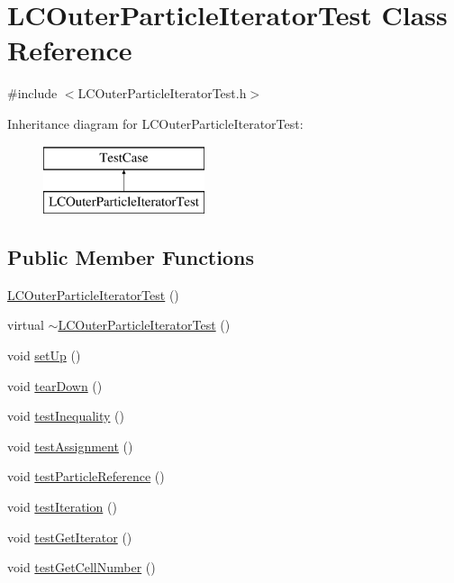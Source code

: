 \hypertarget{classLCOuterParticleIteratorTest}{\section{L\-C\-Outer\-Particle\-Iterator\-Test Class Reference}
\label{classLCOuterParticleIteratorTest}
}


{\ttfamily \#include $<$L\-C\-Outer\-Particle\-Iterator\-Test.\-h$>$}

Inheritance diagram for L\-C\-Outer\-Particle\-Iterator\-Test\-:\begin{figure}[H]
\begin{center}
\leavevmode
\includegraphics[height=2.000000cm]{classLCOuterParticleIteratorTest}
\end{center}
\end{figure}
\subsection*{Public Member Functions}
\begin{DoxyCompactItemize}
\item 
\hyperlink{classLCOuterParticleIteratorTest_aab7e474bcfba162d4d460d4b2018282c}{L\-C\-Outer\-Particle\-Iterator\-Test} ()
\item 
virtual \hyperlink{classLCOuterParticleIteratorTest_ad1ee78ab877c44be37b356f5c5b97854}{$\sim$\-L\-C\-Outer\-Particle\-Iterator\-Test} ()
\item 
void \hyperlink{classLCOuterParticleIteratorTest_a5a6f1dae02d5a9cab63956c4742f8831}{set\-Up} ()
\item 
void \hyperlink{classLCOuterParticleIteratorTest_a519ccd258d5d5ff815eb625865b436a0}{tear\-Down} ()
\item 
void \hyperlink{classLCOuterParticleIteratorTest_ad808d188130e9d259d18beb4cc879403}{test\-Inequality} ()
\item 
void \hyperlink{classLCOuterParticleIteratorTest_a671c0ec78e4b05aa68d4ddfa3702e72a}{test\-Assignment} ()
\item 
void \hyperlink{classLCOuterParticleIteratorTest_a9a239206cec7ee893db0ea0b084f8f4c}{test\-Particle\-Reference} ()
\item 
void \hyperlink{classLCOuterParticleIteratorTest_a6d3b51b7c2ffc2db75bdcd1fa896590f}{test\-Iteration} ()
\item 
void \hyperlink{classLCOuterParticleIteratorTest_a43cedd5dea09cb497bc214e6ebc7cf0f}{test\-Get\-Iterator} ()
\item 
void \hyperlink{classLCOuterParticleIteratorTest_a6fab4347a3aaa0d0c876055d6577332f}{test\-Get\-Cell\-Number} ()
\end{DoxyCompactItemize}
